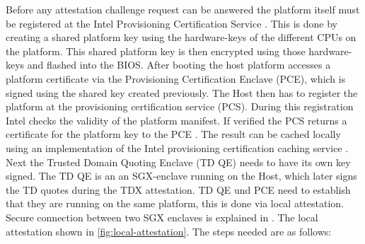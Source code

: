 Before any attestation challenge request can be answered the platform itself must be registered at the Intel Provisioning Certification Service \cite{intel_corporation_dcap_2024-1}. This is done by creating a shared platform key using the hardware-keys of the different CPUs on the platform. This shared platform key is then encrypted using those hardware-keys and flashed into the BIOS. After booting the host platform accesses a platform certificate via the Provisioning Certification Enclave (PCE), which is signed using the shared key created previously. The Host then has to register the platform at the provisioning certification service (PCS). During this registration Intel checks the validity of the platform manifest. If verified the PCS returns a certificate for the platform key to the PCE \cite{cheng_intel_2023}. The result can be cached locally using an implementation of the Intel provisioning certification caching service \cite{caching_service}. Next the Trusted Domain Quoting Enclave (TD QE) needs to have its own key signed. The TD QE is an an SGX-enclave running on the Host, which later signs the TD quotes during the TDX attestation. TD QE und PCE need to establish that they are running on the same platform, this is done via local attestation. Secure connection between two SGX enclaves is explained in \cite{intel_corporation_migration_spec_2023}. The local attestation shown in \cref{fig:local-attestation}. The steps needed are as follows:
\newcommand\setItemnumber[1]{\setcounter{enumi}{\numexpr#1-1\relax}}
